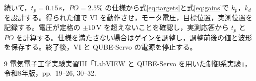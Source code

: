\documentclass[dvipdfmx,a4paper,11pt]{jsarticle}
\begin{document}
続いて，$t_p=0.15\,\mathrm{s}$，$PO=2.5\%$ の仕様から式\eqref{eq:targets}と式\eqref{eq:gains}で $k_p$，$k_d$ を設計する。得られた値で VI を動作させ，モータ電圧，目標位置，実測位置を記録する。電圧が定格の $\pm10\,\mathrm{V}$ を超えないことを確認し，実測応答から $t_p$ と $PO$ を計算する。仕様を満たさない場合はゲインを調整し，調整前後の値と波形を保存する。終了後，VI と QUBE-Servo の電源を停止する。

\begin{thebibliography}{9}
 電気電子工学実験実習III「LabVIEW と QUBE-Servo を用いた制御系実験」，令和8年版，pp.~19--26, 30--32.
\end{thebibliography}
\end{document}
